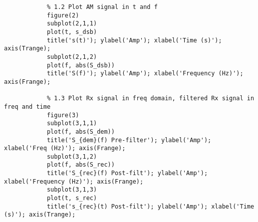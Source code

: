 \documentclass{article}
\begin{document}
\begin{verbatim}
            % 1.2 Plot AM signal in t and f
            figure(2)
            subplot(2,1,1)
            plot(t, s_dsb)
            title('s(t)'); ylabel('Amp'); xlabel('Time (s)'); axis(Trange);
            subplot(2,1,2)
            plot(f, abs(S_dsb))
            title('S(f)'); ylabel('Amp'); xlabel('Frequency (Hz)'); axis(Frange);
            
            % 1.3 Plot Rx signal in freq domain, filtered Rx signal in freq and time
            figure(3)
            subplot(3,1,1)
            plot(f, abs(S_dem))
            title('S_{dem}(f) Pre-filter'); ylabel('Amp'); xlabel('Freq (Hz)'); axis(Frange);
            subplot(3,1,2)
            plot(f, abs(S_rec))
            title('S_{rec}(f) Post-filt'); ylabel('Amp'); xlabel('Frequency (Hz)'); axis(Frange);
            subplot(3,1,3)
            plot(t, s_rec)
            title('s_{rec}(t) Post-filt'); ylabel('Amp'); xlabel('Time (s)'); axis(Trange);
        \end{verbatim}
\end{document}
